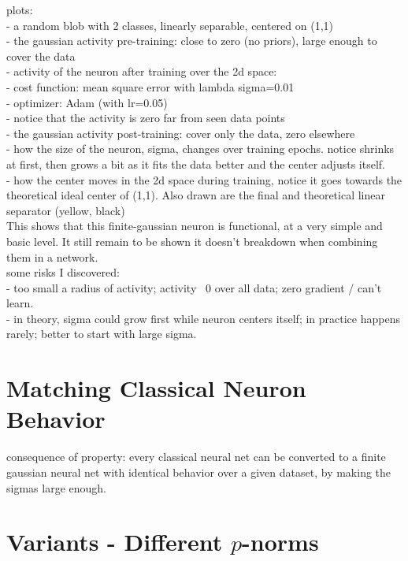 \documentclass{article}
\begin{document}
plots: \\ 
 - a random blob with 2 classes, linearly separable, centered on (1,1)\\
 - the gaussian activity pre-training: close to zero (no priors), large enough to cover the data\\
 - activity of the neuron after training over the 2d space: \\
    - cost function: mean square error with lambda sigma=0.01\\
    - optimizer: Adam (with lr=0.05)\\
    - notice that the activity is zero far from seen data points \\ 
 -  the gaussian activity post-training: cover only the data, zero elsewhere\\
 - how the size of the neuron, sigma, changes over training epochs. notice shrinks at first, then grows a bit as it fits the data better and the center adjusts itself.\\
 - how the center moves in the 2d space during training, notice it goes towards the theoretical ideal center of (1,1). Also drawn are the final and theoretical linear separator (yellow, black)\\
 
 This shows that this finite-gaussian neuron is functional, at a very simple and basic level. It still remain to be shown it doesn't breakdown when combining them in a network.\\
    
some risks I discovered:\\
 - too small a radius of activity; activity ~0 over all data; zero gradient / can't learn. \\ 
 - in theory, sigma could grow first while neuron centers itself; in practice happens rarely; better to start with large sigma. \\ 

\section{Matching Classical Neuron Behavior}
consequence of property:  every classical neural net can be converted to a finite gaussian neural net with identical behavior over a given dataset, by making the sigmas large enough.

\section{Variants - Different $p$-norms}
\end{document}

